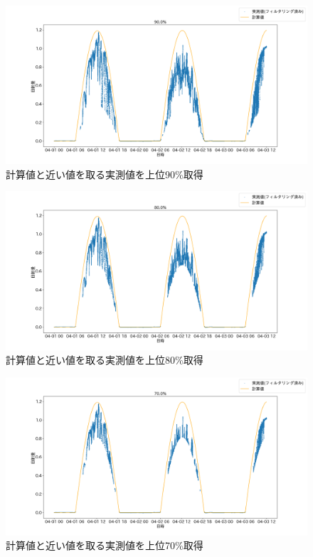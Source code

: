 \documentclass[a4j,12pt,]{jarticle}
\begin{document}
\begin{figure}[H]
  \begin{center}
    \includegraphics[width=160mm]{90.png}
    \caption{計算値と近い値を取る実測値を上位90\%取得}
    \label{p2}
  \end{center}
\end{figure}

\begin{figure}[H]
  \begin{center}
    \includegraphics[width=160mm]{80.png}
    \caption{計算値と近い値を取る実測値を上位80\%取得}
    \label{p3}
  \end{center}
\end{figure}

\begin{figure}[H]
  \begin{center}
    \includegraphics[width=160mm]{70.png}
    \caption{計算値と近い値を取る実測値を上位70\%取得}
    \label{p4}
  \end{center}
\end{figure}
\end{document}
